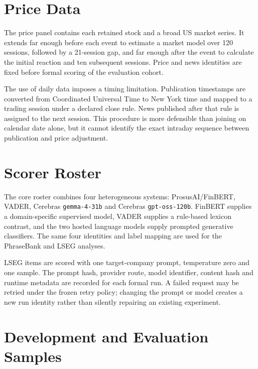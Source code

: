 \documentclass[11pt,a4paper,oneside]{book}
\newif\ifshowdraftnotes
\newcommand{\draftnote}[1]{%
  \ifshowdraftnotes
    \par\smallskip
    \noindent{\color{draftgrey}\small\itshape Drafting note: #1\par}
    \smallskip
  \fi
}
\begin{document}
\draftnote{Insert the frozen date range, source and derived manifest hashes, final item count, event count, symbol coverage and full attrition table after the corpus gate is complete.}

\section{Price Data}
\label{sec:data-prices}

The price panel contains each retained stock and a broad US market series.
It extends far enough before each event to estimate a market model over 120 sessions, followed by a 21-session gap, and far enough after the event to calculate the initial reaction and ten subsequent sessions.
Price and news identities are fixed before formal scoring of the evaluation cohort.

The use of daily data imposes a timing limitation.
Publication timestamps are converted from Coordinated Universal Time to New York time and mapped to a trading session under a declared close rule.
News published after that rule is assigned to the next session.
This procedure is more defensible than joining on calendar date alone, but it cannot identify the exact intraday sequence between publication and price adjustment.

\section{Scorer Roster}
\label{sec:data-roster}

The core roster combines four heterogeneous systems: ProsusAI/FinBERT, VADER, Cerebras \texttt{gemma-4-31b} and Cerebras \texttt{gpt-oss-120b}.
FinBERT supplies a domain-specific supervised model, VADER supplies a rule-based lexicon contrast, and the two hosted language models supply prompted generative classifiers.
The same four identities and label mapping are used for the PhraseBank and LSEG analyses.

LSEG items are scored with one target-company prompt, temperature zero and one sample.
The prompt hash, provider route, model identifier, content hash and runtime metadata are recorded for each formal run.
A failed request may be retried under the frozen retry policy; changing the prompt or model creates a new run identity rather than silently repairing an existing experiment.

\section{Development and Evaluation Samples}
\label{sec:data-split}
\end{document}
